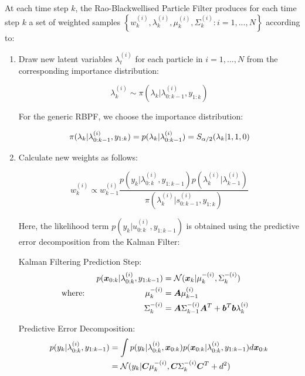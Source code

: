 \documentclass[../main.tex]{subfiles}
\begin{document}
At each time step $k$, the Rao-Blackwellised Particle Filter produces for each time step $k$ a set of weighted samples $\left\{ w_k^{(i)}, \lambda_k^{(i)}, \mu_k^{(i)}, \Sigma_k^{(i)} : i = 1,...,N \right\}$ according to: 


\begin{enumerate}
	\item Draw new latent variables $\lambda_t^{(i)}$ for each particle in $i = 1,...,N$ from the corresponding importance distribution: 
	
	\begin{equation}
		\lambda_k^{(i)} \sim \pi(\lambda_k | \lambda_{0:k-1}^{(i)}, y_{1:k})
	\end{equation}
	
	For the generic RBPF, we choose the importance distribution: 
	
	\begin{equation}
		\pi(\lambda_k | \lambda_{0:k-1}^{(i)}, y_{1:k}) = p(\lambda_k | \lambda_{0:k-1}^{(i)}) = S_{\alpha/2}(\lambda_k | 1, 1, 0)
		\label{eq:2__2__2__RBPF_importance_dist}
	\end{equation}
	
	\item Calculate new weights as follows:
	
	\begin{equation}
		w_k^{(i)} \propto w_{k-1}^{(i)} \frac{p(y_k | \lambda_{0:k}^{(i)}, y_{1:k-1}) p(\lambda_k^{(i)} | \lambda_{k-1}^{(i)})}{\pi(\lambda_k^{(i)} | s_{0:k-1}^{(i)}, y_{1:k})}
	\end{equation}
	
	Here, the likelihood term $p(y_k | u_{0:k}^{(i)}, y_{1:k-1})$ is obtained using the predictive error decomposition from the Kalman Filter:
	
	Kalman Filtering Prediction Step: 
	\begin{align}
		& & p(\bm{x}_{0:k} | \lambda_{0:k}^{(i)}, y_{1:k-1} ) &= \mathcal{N}(\bm{x}_{k} | \mu_k^{-(i)}, \Sigma_k^{-(i)})&& \\
		& \text{where: } & \mu_k^{-(i)} &= \bm{A}\mu_{k-1}^{(i)}&& \notag\\
		& & \Sigma_k^{-(i)} & = \bm{A}\Sigma_{k-1}^{-(i)} \bm{A}^T + \bm{b}^T\bm{b} \lambda_{k}^{(i)}&& \notag
	\end{align}
	
	Predictive Error Decomposition:
	\begin{align}
		p(y_k | \lambda_{0:k}^{(i)}, y_{1:k-1}) &= \int p(y_k | \lambda_{0:k}^{(i)}, \bm{x}_{0:k}) p( \bm{x}_{0:k} | \lambda_{0:k}^{(i)}, y_{1:k-1}) d\bm{x}_{0:k}\notag\\
		&= \mathcal{N}(y_k | \bm{C} \mu_{k}^{-(i)}, \bm{C} \Sigma_k^{-(i)} \bm{C}^T  + d^2)
	\end{align}
	

\end{enumerate}
\end{document}
